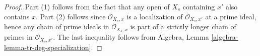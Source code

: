 \begin{proof}
Part (1) follows from the fact that any open of $X_s$ containing $x'$
also contains $x$. Part (2) follows since $\mathcal{O}_{X_s, x}$ is a
localization of $\mathcal{O}_{X_s, x'}$ at a prime ideal, hence any chain
of prime ideals in $\mathcal{O}_{X_s, x}$ is part of a strictly longer
chain of primes in $\mathcal{O}_{X_s, x'}$. The last inequality follows from
Algebra, Lemma \ref{algebra-lemma-tr-deg-specialization}.
\end{proof}






